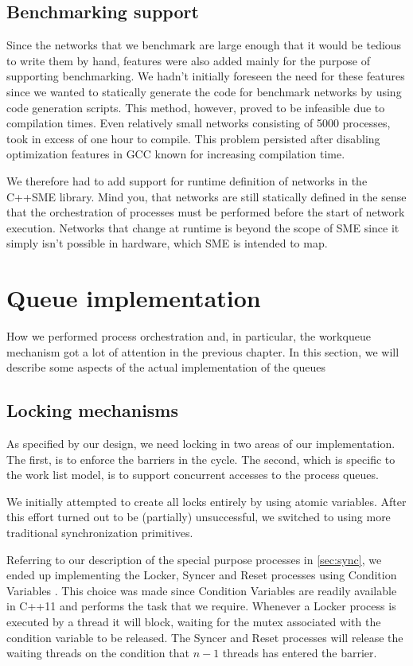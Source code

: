 \subsection{Benchmarking support}
Since the networks that we benchmark are large enough that it would be
tedious to write them by hand, features were also added mainly for the
purpose of supporting benchmarking. We hadn't initially foreseen the
need for these features since we wanted to statically generate the
code for benchmark networks by using code generation scripts. This
method, however, proved to be infeasible due to compilation
times. Even relatively small networks consisting of 5000 processes,
took in excess of one hour to compile. This problem persisted after disabling
optimization features in GCC known for increasing compilation time.

We therefore had to add support for runtime definition of networks in
the C++SME library. Mind you, that networks are still statically
defined in the sense that the orchestration of processes must be
performed before the start of network execution. Networks that change
at runtime is beyond the scope of SME since it simply isn't possible
in hardware, which SME is intended to map.

\section{Queue implementation}
How we performed process orchestration and, in particular, the
workqueue mechanism got a lot of attention in the previous chapter. In
this section, we will describe some aspects of the actual
implementation of the queues

\subsection{Locking mechanisms}
As specified by our design, we need locking in two areas of our
implementation. The first, is to enforce the barriers in the
cycle. The second, which is specific to the work list model, is to
support concurrent accesses to the process queues.

We initially attempted to create all locks entirely by using atomic
variables. After this effort turned out to be (partially)
unsuccessful, we switched to using more traditional synchronization
primitives.

Referring to our description of the special purpose processes in
\cref{sec:sync}, we ended up implementing the Locker, Syncer and Reset
processes using Condition Variables
\cite{Hoare:1974:MOS:355620.361161}. This choice was made since
Condition Variables are readily available in C++11 and performs the
task that we require. Whenever a Locker process is executed by a
thread it will block, waiting for the mutex associated with the
condition variable to be released. The
Syncer and Reset processes will release the waiting threads on the
condition that $n-1$ threads has entered the barrier. 

